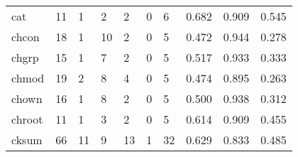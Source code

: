\begin{longtable}{lp{1.3cm}p{1.3cm}p{1.3cm}p{1.3cm}p{1.3cm}p{1.3cm}p{1.3cm}p{1.3cm}p{1.3cm}}
cat       &                     11 &                                             1 &                                            2 &                                           2 &                                            0 &                                          6 &                                0.682 &                                  0.909 &                                0.545 \\
chcon     &                     18 &                                             1 &                                           10 &                                           2 &                                            0 &                                          5 &                                0.472 &                                  0.944 &                                0.278 \\
chgrp     &                     15 &                                             1 &                                            7 &                                           2 &                                            0 &                                          5 &                                0.517 &                                  0.933 &                                0.333 \\
chmod     &                     19 &                                             2 &                                            8 &                                           4 &                                            0 &                                          5 &                                0.474 &                                  0.895 &                                0.263 \\
chown     &                     16 &                                             1 &                                            8 &                                           2 &                                            0 &                                          5 &                                0.500 &                                  0.938 &                                0.312 \\
chroot    &                     11 &                                             1 &                                            3 &                                           2 &                                            0 &                                          5 &                                0.614 &                                  0.909 &                                0.455 \\
cksum     &                     66 &                                            11 &                                            9 &                                          13 &                                            1 &                                         32 &                                0.629 &                                  0.833 &                                0.485 \\

\end{longtable}
